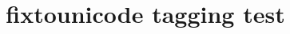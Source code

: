 \documentclass{article}
\title{fixtounicode tagging test}
\begin{document}
\Coffeecup

\Radioactivity

\Football
\end{document}

